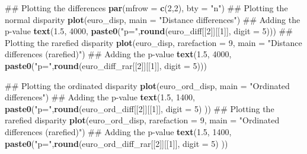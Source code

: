 \documentclass[]{book}
\newenvironment{Shaded}{\begin{snugshade}}{\end{snugshade}}
\newcommand{\KeywordTok}[1]{\textcolor[rgb]{0.13,0.29,0.53}{\textbf{#1}}}
\newcommand{\DataTypeTok}[1]{\textcolor[rgb]{0.13,0.29,0.53}{#1}}
\newcommand{\DecValTok}[1]{\textcolor[rgb]{0.00,0.00,0.81}{#1}}
\newcommand{\FloatTok}[1]{\textcolor[rgb]{0.00,0.00,0.81}{#1}}
\newcommand{\StringTok}[1]{\textcolor[rgb]{0.31,0.60,0.02}{#1}}
\newcommand{\NormalTok}[1]{#1}
\theoremstyle{definition}
\theoremstyle{definition}
\theoremstyle{remark}
\begin{document}
\begin{Shaded}
\begin{Highlighting}[]
\NormalTok{## Plotting the differences}
\KeywordTok{par}\NormalTok{(}\DataTypeTok{mfrow =} \KeywordTok{c}\NormalTok{(}\DecValTok{2}\NormalTok{,}\DecValTok{2}\NormalTok{), }\DataTypeTok{bty =} \StringTok{"n"}\NormalTok{)}
\NormalTok{## Plotting the normal disparity}
\KeywordTok{plot}\NormalTok{(euro_disp, }\DataTypeTok{main =} \StringTok{"Distance differences"}\NormalTok{)}
\NormalTok{## Adding the p-value}
\KeywordTok{text}\NormalTok{(}\FloatTok{1.5}\NormalTok{, }\DecValTok{4000}\NormalTok{, }\KeywordTok{paste0}\NormalTok{(}\StringTok{"p="}\NormalTok{,}\KeywordTok{round}\NormalTok{(euro_diff[[}\DecValTok{2}\NormalTok{]][[}\DecValTok{1}\NormalTok{]], }\DataTypeTok{digit =} \DecValTok{5}\NormalTok{)))}
\NormalTok{## Plotting the rarefied disparity}
\KeywordTok{plot}\NormalTok{(euro_disp, }\DataTypeTok{rarefaction =} \DecValTok{9}\NormalTok{, }\DataTypeTok{main =} \StringTok{"Distance differences (rarefied)"}\NormalTok{)}
\NormalTok{## Adding the p-value}
\KeywordTok{text}\NormalTok{(}\FloatTok{1.5}\NormalTok{, }\DecValTok{4000}\NormalTok{, }\KeywordTok{paste0}\NormalTok{(}\StringTok{"p="}\NormalTok{,}\KeywordTok{round}\NormalTok{(euro_diff_rar[[}\DecValTok{2}\NormalTok{]][[}\DecValTok{1}\NormalTok{]], }\DataTypeTok{digit =} \DecValTok{5}\NormalTok{)))}

\NormalTok{## Plotting the ordinated disparity}
\KeywordTok{plot}\NormalTok{(euro_ord_disp, }\DataTypeTok{main =} \StringTok{"Ordinated differences"}\NormalTok{)}
\NormalTok{## Adding the p-value}
\KeywordTok{text}\NormalTok{(}\FloatTok{1.5}\NormalTok{, }\DecValTok{1400}\NormalTok{, }\KeywordTok{paste0}\NormalTok{(}\StringTok{"p="}\NormalTok{,}\KeywordTok{round}\NormalTok{(euro_ord_diff[[}\DecValTok{2}\NormalTok{]][[}\DecValTok{1}\NormalTok{]], }\DataTypeTok{digit =} \DecValTok{5}\NormalTok{) ))}
\NormalTok{## Plotting the rarefied disparity}
\KeywordTok{plot}\NormalTok{(euro_ord_disp, }\DataTypeTok{rarefaction =} \DecValTok{9}\NormalTok{, }\DataTypeTok{main =} \StringTok{"Ordinated differences (rarefied)"}\NormalTok{)}
\NormalTok{## Adding the p-value}
\KeywordTok{text}\NormalTok{(}\FloatTok{1.5}\NormalTok{, }\DecValTok{1400}\NormalTok{, }\KeywordTok{paste0}\NormalTok{(}\StringTok{"p="}\NormalTok{,}\KeywordTok{round}\NormalTok{(euro_ord_diff_rar[[}\DecValTok{2}\NormalTok{]][[}\DecValTok{1}\NormalTok{]], }\DataTypeTok{digit =} \DecValTok{5}\NormalTok{) ))}
\end{Highlighting}
\end{Shaded}
\end{document}

